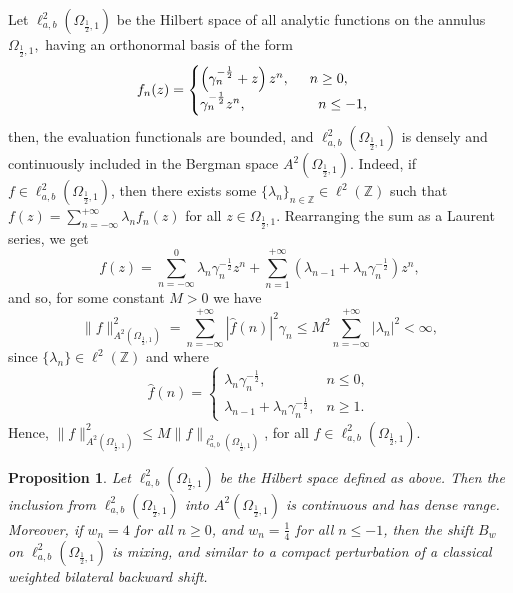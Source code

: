 \documentclass[12pt, reqno]{amsart}
\newtheorem{proposition}[theorem]{Proposition}
\theoremstyle{definition}
\theoremstyle{remark}
\numberwithin{equation}{section}
\begin{document}
  Let $\ell^{2}_{a,b}(\Omega_{\frac{1}{2},1})$ be the Hilbert space of all analytic functions on the annulus $\Omega_{\frac{1}{2},1},$ having an orthonormal basis of the form  
\[
f_n(z)=
\begin{cases}
   \left( \gamma_{n}^{-\frac{1}{2}}+z\right)z^{n}, \hskip.5cm n\geq 0,\\  \gamma_{n}^{-\frac{1}{2}} z^{n},\hskip 1.8cm n\leq -1,
\end{cases}
\]
then, the evaluation functionals are bounded, and $\ell^{2}_{a,b}(\Omega_{\frac{1}{2},1})$ is densely and continuously included in the Bergman space  $A^{2}(\Omega_{\frac{1}{2},1})$. Indeed, if $f\in \ell^{2}_{a,b}(\Omega_{\frac{1}{2},1})$, then there exists some $\{\lambda_n\}_{n\in\mathbb{Z}}\in\ell^2(\mathbb{Z})$ such that $f(z)=\sum_{n=-\infty}^{
+\infty} \lambda_n f_n(z)$ for all $z\in \Omega_{\frac{1}{2},1}$. Rearranging the sum as a Laurent series, we get 
\[
f(z)=\sum_{n=-\infty}^{0}\lambda_{n} \gamma_{n}^{-\frac{1}{2}}z^{n}+\sum_{n=1}^{+\infty} \left(\lambda_{n-1}+\lambda_n \gamma_{n}^{-\frac{1}{2}}\right)z^n,
\]
and so, for some constant $M>0$ we have
\[
 \lVert f\rVert^{2}_{A^{2}(\Omega_{\frac{1}{2},1})}=\sum_{n=-\infty}^{+\infty}|\widehat{f}(n)|^{2}\gamma_{n}\leq M^2\sum_{n=-\infty}^{+\infty}|\lambda_n|^2<\infty,
\]
since $\{\lambda_n\}\in\ell^2(\mathbb{Z})$ and where
\[
\widehat{f}(n) =
\begin{cases}
\lambda_{n}\gamma_{n}^{-\frac{1}{2}}, & n\le 0,\\[0.7em]
\lambda_{n-1}+\lambda_{n}\gamma_{n}^{-\frac{1}{2}}, & n\ge 1.
\end{cases}
\]
Hence, $\lVert f\rVert^{2}_{A^{2}(\Omega_{\frac{1}{2},1})}\leq M \|f\|_{\ell^{2}_{a,b}(\Omega_{\frac{1}{2},1})}$, for all $f\in \ell^{2}_{a,b}(\Omega_{\frac{1}{2},1})$.
 \begin{proposition}
Let $\ell^{2}_{a,b}(\Omega_{\frac{1}{2},1})$ be the Hilbert space defined as above. Then the inclusion from $\ell^{2}_{a,b}(\Omega_{\frac{1}{2},1})$ into $A^{2}(\Omega_{\frac{1}{2},1})$ is continuous and has dense range. Moreover, if $w_{n}=4$ for all $n\geq 0$, and $w_{n}=\tfrac{1}{4}$ for all $n\leq -1$, then the shift $B_{w}$ on $\ell^{2}_{a,b}(\Omega_{\frac{1}{2},1})$ is mixing, and similar to a compact perturbation of a classical weighted bilateral backward shift.
\end{proposition}
\end{document}
